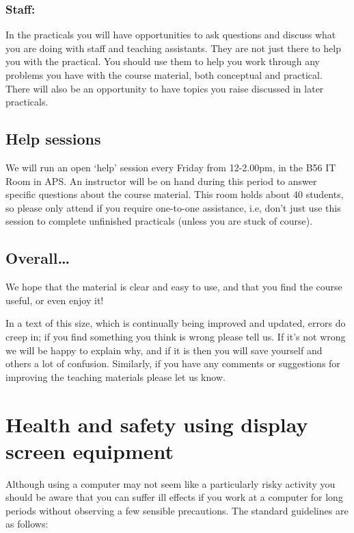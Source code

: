 \documentclass[]{book}
\begin{document}
\subsubsection{Staff:}\label{staff}

In the practicals you will have opportunities to ask questions and
discuss what you are doing with staff and teaching assistants. They are
not just there to help you with the practical. You should use them to
help you work through any problems you have with the course material,
both conceptual and practical. There will also be an opportunity to have
topics you raise discussed in later practicals.

\subsection{Help sessions}\label{help}

We will run an open `help' session every Friday from 12-2.00pm, in the
B56 IT Room in APS. An instructor will be on hand during this period to
answer specific questions about the course material. This room holds
about 40 students, so please only attend if you require one-to-one
assistance, i.e, don't just use this session to complete unfinished
practicals (unless you are stuck of course).

\subsection{Overall\ldots{}}\label{overall}

We hope that the material is clear and easy to use, and that you find
the course useful, or even enjoy it!

In a text of this size, which is continually being improved and updated,
errors do creep in; if you find something you think is wrong please tell
us. If it's not wrong we will be happy to explain why, and if it is then
you will save yourself and others a lot of confusion. Similarly, if you
have any comments or suggestions for improving the teaching materials
please let us know.

\section{Health and safety using display screen
equipment}\label{health-and-safety}

Although using a computer may not seem like a particularly risky
activity you should be aware that you can suffer ill effects if you work
at a computer for long periods without observing a few sensible
precautions. The standard guidelines are as follows:
\end{document}
